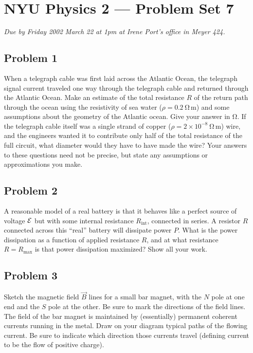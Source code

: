 \documentclass{article}
\begin{document}
\thispagestyle{empty}
\section*{NYU Physics 2 --- Problem Set 7}

\emph{Due by Friday 2002 March 22 at 1pm at Irene Port's office in
Meyer 424.}

\subsection*{Problem 1}

When a telegraph cable was first laid across the Atlantic Ocean, the
telegraph signal current traveled one way through the telegraph cable
and returned through the Atlantic Ocean.  Make an estimate of the
total resistance $R$ of the return path through the ocean using the
resistivity of sea water ($\rho= 0.2~\mathrm{\Omega\,m}$) and some
assumptions about the geometry of the Atlantic ocean.  Give your
answer in $\mathrm{\Omega}$.  If the telegraph cable itself was a
single strand of copper ($\rho= 2\times 10^{-8}~\mathrm{\Omega\,m}$)
wire, and the engineers wanted it to contribute only half of the total
resistance of the full circuit, what diameter would they have to have
made the wire?  Your answers to these questions need not be precise,
but state any assumptions or approximations you make.

\subsection*{Problem 2}

A reasonable model of a real battery is that it behaves like a perfect
source of voltage $\cal E$ but with some internal resistance
$R_\mathrm{int}$, connected in series.  A resistor $R$ connected
across this ``real'' battery will dissipate power $P$.  What is the
power dissipation as a function of applied resistance $R$, and at what
resistance $R=R_\mathrm{max}$ is that power dissipation maximized?
Show all your work.

\subsection*{Problem 3}

Sketch the magnetic field $\vec{B}$ lines for a small bar magnet, with
the $N$ pole at one end and the $S$ pole at the other.  Be sure to
mark the directions of the field lines.  The field of the bar magnet
is maintained by (essentially) permanent coherent currents running in
the metal.  Draw on your diagram typical paths of the flowing current.
Be sure to indicate which direction those currents travel (defining
current to be the flow of positive charge).
\end{document}
